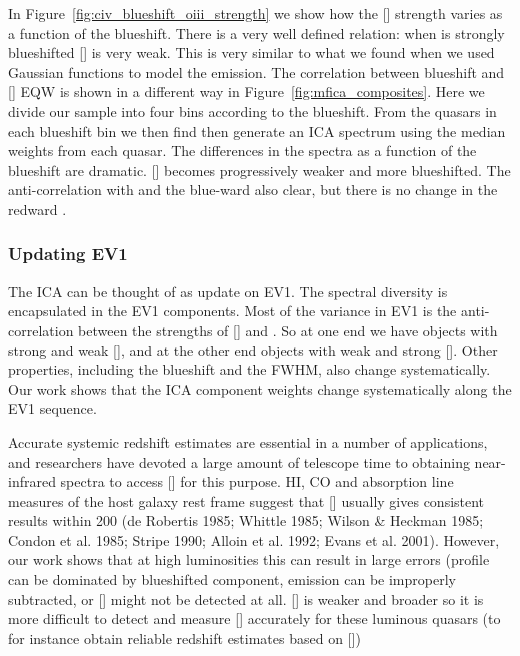 In Figure~\ref{fig:civ_blueshift_oiii_strength} we show how the [] strength varies as a function of the  blueshift. 
There is a very well defined relation: when  is strongly blueshifted [] is very weak. 
This is very similar to what we found when we used Gaussian functions to model the emission. 
The correlation between  blueshift and [] EQW is shown in a different way in Figure~\ref{fig:mfica_composites}. 
Here we divide our sample into four bins according to the  blueshift. 
From the quasars in each  blueshift bin we then find then generate an ICA spectrum using the median weights from each quasar. 
The differences in the spectra as a function of the  blueshift are dramatic. 
[] becomes progressively weaker and more blueshifted.
The anti-correlation with  and the blue-ward  also clear, but there is no change in the redward . 

\subsubsection{Updating EV1}

The ICA can be thought of as update on EV1. 
The spectral diversity is encapsulated in the EV1 components. 
Most of the variance in EV1 is the anti-correlation between the strengths of [] and . 
So at one end we have objects with strong  and weak [], and at the other end objects with weak  and strong []. 
Other properties, including the  blueshift and the \hb FWHM, also change systematically. 
Our work shows that the ICA component weights change systematically along the EV1 sequence. 


Accurate systemic redshift estimates are essential in a number of applications, and researchers have devoted a large amount of telescope time to obtaining near-infrared spectra to access [] for this purpose. 
HI, CO and absorption line measures of the host galaxy rest frame suggest that [] usually gives consistent results within 200 \kms (de Robertis 1985; Whittle 1985; Wilson \& Heckman 1985; Condon et al. 1985; Stripe 1990; Alloin et al. 1992; Evans et al. 2001).  
However, our work shows that at high luminosities this can result in large errors (profile can be dominated by blueshifted component,  emission can be improperly subtracted, or [] might not be detected at all. 
[] is weaker and broader so it is more difficult to detect and measure [] accurately for these luminous quasars (to for instance obtain reliable redshift estimates based on [])

